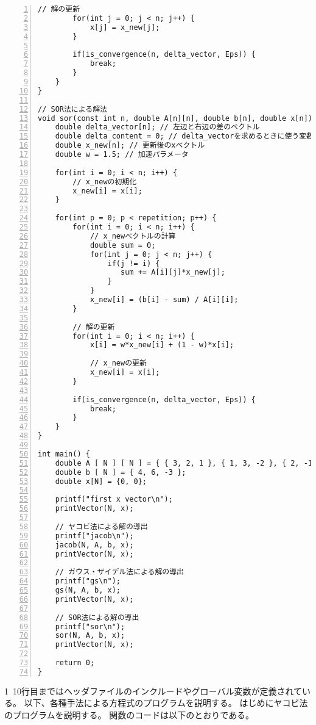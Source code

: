 \documentclass[a4paper]{jsarticle}
\begin{document}
\begin{lstlisting}[caption={\texttt{作成した全プログラム}}, numbers={left}, label={all_solution_code}]
        // 解の更新
        for(int j = 0; j < n; j++) {
            x[j] = x_new[j];
        }

        if(is_convergence(n, delta_vector, Eps)) {
            break;
        }
    }
}

// SOR法による解法
void sor(const int n, double A[n][n], double b[n], double x[n]) {
    double delta_vector[n]; // 左辺と右辺の差のベクトル
    double delta_content = 0; // delta_vectorを求めるときに使う変数
    double x_new[n]; // 更新後のxベクトル
    double w = 1.5; // 加速パラメータ

    for(int i = 0; i < n; i++) {
        // x_newの初期化
        x_new[i] = x[i];
    }

    for(int p = 0; p < repetition; p++) {
        for(int i = 0; i < n; i++) {
            // x_newベクトルの計算
            double sum = 0;
            for(int j = 0; j < n; j++) {
                if(j != i) {
                   sum += A[i][j]*x_new[j];
                }
            }
            x_new[i] = (b[i] - sum) / A[i][i];
        }

        // 解の更新
        for(int i = 0; i < n; i++) {
            x[i] = w*x_new[i] + (1 - w)*x[i];

            // x_newの更新
            x_new[i] = x[i];
        }

        if(is_convergence(n, delta_vector, Eps)) {
            break;
        }
    }
}

int main() {
    double A [ N ] [ N ] = { { 3, 2, 1 }, { 1, 3, -2 }, { 2, -1, 4 } };
    double b [ N ] = { 4, 6, -3 };
    double x[N] = {0, 0};

    printf("first x vector\n");
    printVector(N, x);

    // ヤコビ法による解の導出
    printf("jacob\n");
    jacob(N, A, b, x);
    printVector(N, x);

    // ガウス・ザイデル法による解の導出
    printf("gs\n");
    gs(N, A, b, x);
    printVector(N, x);

    // SOR法による解の導出
    printf("sor\n");
    sor(N, A, b, x);
    printVector(N, x);

    return 0;
}
\end{lstlisting}

1~10行目まではヘッダファイルのインクルードやグローバル変数が定義されている。
以下、各種手法による方程式のプログラムを説明する。
はじめにヤコビ法のプログラムを説明する。
関数のコードは以下のとおりである。
\end{document}

